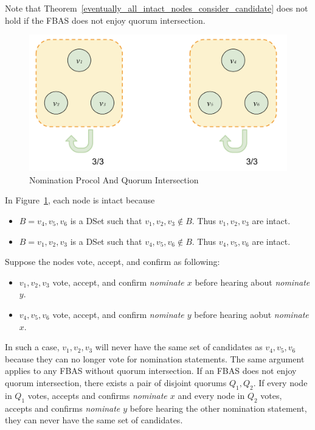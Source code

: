 \begin{rem}
    Note that Theorem~\ref{eventually_all_intact_nodes_consider_candidate} does not hold if the FBAS does not enjoy quorum intersection.
    \begin{figure}[!htb]
        \includegraphics[width=.5\linewidth]{img/nomination_counterexample.jpeg}
        \caption{Nomination Procol And Quorum Intersection}
        \label{fig:nomination_counterexample}
    \end{figure}
    In Figure~\ref{fig:nomination_counterexample}, each node is intact because
    \begin{itemize}
        \item
            $B = {v_4, v_5, v_6}$ is a DSet such that $v_1, v_2, v_3 \notin B$.
            Thus $v_1, v_2, v_3$ are intact.
        \item
            $B = {v_1, v_2, v_3}$ is a DSet such that $v_4, v_5, v_6 \notin B$.
            Thus $v_4, v_5, v_6$ are intact.
    \end{itemize}
    Suppose the nodes vote, accept, and confirm as following:
    \begin{itemize}
        \item
            $v_1, v_2, v_3$ vote, accept, and confirm \textit{nominate $x$} before hearing about \textit{nominate $y$}.
        \item
            $v_4, v_5, v_6$ vote, accept, and confirm \textit{nominate $y$} before hearing aobut \textit{nominate $x$}.
    \end{itemize}
    In such a case, $v_1, v_2, v_3$ will never have the same set of candidates as $v_4, v_5, v_6$ because they can no longer vote for nomination statements.
    The same argument applies to any FBAS without quorum intersection.
    If an FBAS does not enjoy quorum intersection, there exists a pair of disjoint quorums $Q_1, Q_2$.
    If every node in $Q_1$ votes, accepts and confirms \textit{nominate $x$} and every node in $Q_2$ votes, accepts and confirms \textit{nominate $y$} before hearing the other nomination statement, they can never have the same set of candidates.
\end{rem}

